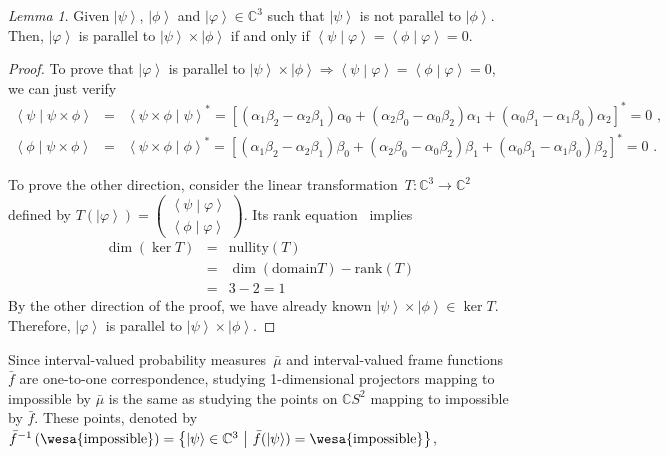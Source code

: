\documentclass{article}
\theoremstyle{remark}
\newtheorem{lemma}{Lemma}
\newcommand{\imposs}{{\mbox{\wesa{impossible}}}}
\newcommand{\ket}[1]{{\left\vert{#1}\right\rangle}}
\newcommand{\ip}[2]{\ensuremath{\left\langle{#1}\middle\vert{#2}\right\rangle}}
\newcommand{\set}[2]{\ensuremath{\left\{ {#1}~\middle|~{#2}\right\} }}
\begin{document}
\begin{lemma}Given $\ket{\psi}$, $\ket{\phi}$ and $\ket{\varphi}\in\mathbb{C}^{3}$
such that $\ket{\psi}$ is not parallel to $\ket{\phi}$. Then, $\ket{\varphi}$
is parallel to $\ket{\psi}\times\ket{\phi}$ if and only if $\ip{\psi}{\varphi}=\ip{\phi}{\varphi}=0$.\end{lemma}
\begin{proof}
To prove that $\ket{\varphi}$ is parallel to $\ket{\psi}\times\ket{\phi}\Rightarrow\ip{\psi}{\varphi}=\ip{\phi}{\varphi}=0$,
we can just verify 
\begin{eqnarray*}
\ip{\psi}{\psi\times\phi} & = & \ip{\psi\times\phi}{\psi}^{*}=\left[\left(\alpha_{1}\beta_{2}-\alpha_{2}\beta_{1}\right)\alpha_{0}+\left(\alpha_{2}\beta_{0}-\alpha_{0}\beta_{2}\right)\alpha_{1}+\left(\alpha_{0}\beta_{1}-\alpha_{1}\beta_{0}\right)\alpha_{2}\right]^{*}=0\textrm{ ,}\\
\ip{\phi}{\psi\times\phi} & = & \ip{\psi\times\phi}{\phi}^{*}=\left[\left(\alpha_{1}\beta_{2}-\alpha_{2}\beta_{1}\right)\beta_{0}+\left(\alpha_{2}\beta_{0}-\alpha_{0}\beta_{2}\right)\beta_{1}+\left(\alpha_{0}\beta_{1}-\alpha_{1}\beta_{0}\right)\beta_{2}\right]^{*}=0\textrm{ .}
\end{eqnarray*}

To prove the other direction, consider the linear transformation~$T:\mathbb{C}^{3}\rightarrow\mathbb{C}^{2}$
defined by $T\left(\ket{\varphi}\right)=\begin{pmatrix}\ip{\psi}{\varphi}\\
\ip{\phi}{\varphi}
\end{pmatrix}$. Its rank equation~\cite{FraleighBeauregard1995} implies
\begin{eqnarray*}
\dim\left(\ker T\right) & = & \mathrm{nullity}\left(T\right)\\
 & = & \dim\left(\mathrm{domain}T\right)-\mathrm{rank}\left(T\right)\\
 & = & 3-2=1
\end{eqnarray*}
By the other direction of the proof, we have already known $\ket{\psi}\times\ket{\phi}\in\ker T$.
Therefore, $\ket{\varphi}$ is parallel to $\ket{\psi}\times\ket{\phi}$.
\end{proof}
Since interval-valued probability measures~$\bar{\mu}$ and interval-valued
frame functions~$\bar{f}$ are one-to-one correspondence, studying
1-dimensional projectors mapping to impossible by $\bar{\mu}$ is
the same as studying the points on $\mathbb{C}S^{2}$ mapping to impossible
by $\bar{f}$. These points, denoted by $\bar{f}^{-1}\left(\imposs\right)=\set{\ket{\psi}\in\mathbb{C}^{3}}{\bar{f}(\ket{\psi})=\imposs}$,
\end{document}
